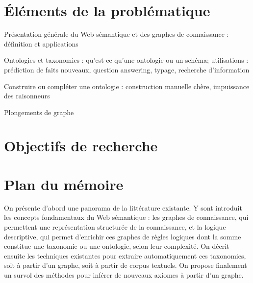 \clearpage

\section{Éléments de la problématique}  %




Présentation générale du Web sémantique et des graphes de connaissance : définition et applications

Ontologies et taxonomies : qu'est-ce qu'une ontologie ou un schéma; utilisations : prédiction de faits nouveaux, question answering, typage, recherche d'information

Construire ou compléter une ontologie : construction manuelle chère, impuissance des raisonneurs

Plongements de graphe






\section{Objectifs de recherche}  %


\section{Plan du mémoire}  %


On présente d'abord une panorama de la littérature existante. Y sont introduit les concepts fondamentaux du Web sémantique : les graphes de connaissance, qui permettent une représentation structurée de la connaissance, et la logique descriptive, qui permet d'enrichir ces graphes de règles logiques dont la somme constitue une taxonomie ou une ontologie, selon leur complexité. On décrit ensuite les techniques existantes pour extraire automatiquement ces taxonomies, soit à partir d'un graphe, soit à partir de corpus textuels. On propose finalement un survol des méthodes pour inférer de nouveaux axiomes à partir d'un graphe.

